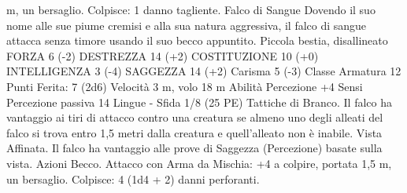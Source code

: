\begin{multicols}{2}
m, un bersaglio.
Colpisce: 1 danno tagliente.
Falco di Sangue
Dovendo il suo nome alle sue piume cremisi e alla sua
natura aggressiva, il falco di sangue attacca senza
timore usando il suo becco appuntito.
Piccola bestia, disallineato
FORZA 6 (-2)
DESTREZZA 14 (+2)
COSTITUZIONE 10 (+0)
INTELLIGENZA 3 (-4)
SAGGEZZA 14 (+2)
Carisma 5 (-3)
Classe Armatura 12
\hspace*{0pt}\hfill{Punti Ferita}: 7 (2d6)
Velocità 3 m, volo 18 m
Abilità Percezione +4
Sensi Percezione passiva 14
Lingue -
Sfida 1/8 (25 PE)
Tattiche di Branco. Il falco ha vantaggio ai tiri di attacco contro
una creatura se almeno uno degli alleati del falco si trova entro
1,5 metri dalla creatura e quell’alleato non è inabile.
Vista Affinata. Il falco ha vantaggio alle prove di Saggezza
(Percezione) basate sulla vista.
Azioni
Becco. Attacco con Arma da Mischia: +4 a colpire, portata 1,5
m, un bersaglio.
Colpisce: 4 (1d4 + 2) danni perforanti.
 

\end{multicols}
